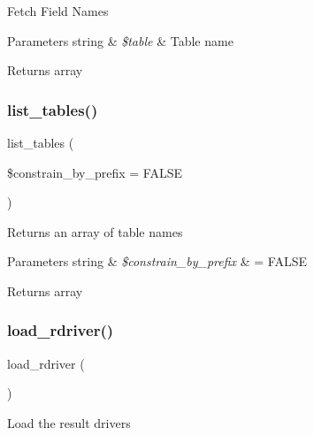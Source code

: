 Fetch Field Names


\begin{DoxyParams}[1]{Parameters}
string & {\em \$table} & Table name \\
\hline
\end{DoxyParams}
\begin{DoxyReturn}{Returns}
array 
\end{DoxyReturn}
\mbox{\label{class_c_i___d_b__driver_accef90659bed312aba1c3df80620b402}} 
\subsubsection{\texorpdfstring{list\+\_\+tables()}{list\_tables()}}
{\footnotesize\ttfamily list\+\_\+tables (\begin{DoxyParamCaption}\item[{}]{\$constrain\+\_\+by\+\_\+prefix = {\ttfamily FALSE} }\end{DoxyParamCaption})}

Returns an array of table names


\begin{DoxyParams}[1]{Parameters}
string & {\em \$constrain\+\_\+by\+\_\+prefix} & = F\+A\+L\+SE \\
\hline
\end{DoxyParams}
\begin{DoxyReturn}{Returns}
array 
\end{DoxyReturn}
\mbox{\label{class_c_i___d_b__driver_a0bd509a0088f09f4bbfbcbbe78bc3547}} 
\subsubsection{\texorpdfstring{load\+\_\+rdriver()}{load\_rdriver()}}
{\footnotesize\ttfamily load\+\_\+rdriver (\begin{DoxyParamCaption}{ }\end{DoxyParamCaption})}

Load the result drivers

